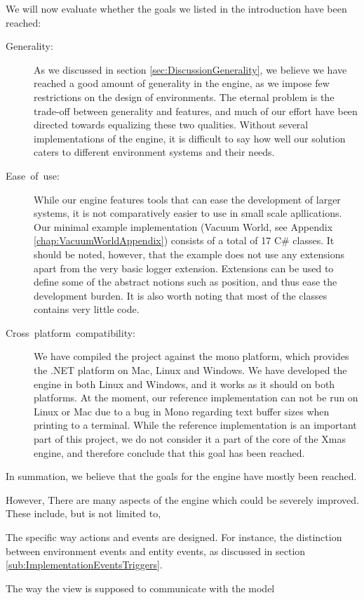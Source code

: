 We will now evaluate whether the goals we listed in the introduction
have been reached:
\begin{description}
\item [{Generality:}] As we discussed in section \ref{sec:DiscussionGenerality},
we believe we have reached a good amount of generality in the engine,
as we impose few restrictions on the design of environments. The eternal
problem is the trade-off between generality and features, and much
of our effort have been directed towards equalizing these two qualities.
Without several implementations of the engine, it is difficult to
say how well our solution caters to different environment systems
and their needs.
\item [{Ease~of~use:}] While our engine features tools that can ease
the development of larger systems, it is not comparatively easier
to use in small scale apllications. Our minimal example implementation
(Vacuum World, see Appendix \ref{chap:VacuumWorldAppendix}) consists
of a total of 17 C\# classes. It should be noted, however, that the
example does not use any extensions apart from the very basic logger
extension. Extensions can be used to define some of the abstract notions
such as position, and thus ease the development burden. It is also
worth noting that most of the classes contains very little code.
\item [{Cross~platform~compatibility:}] We have compiled the project
against the mono platform, which provides the .NET platform on Mac,
Linux and Windows. We have developed the engine in both Linux and
Windows, and it works as it should on both platforms. At the moment,
our reference implementation can not be run on Linux or Mac due to
a bug in Mono regarding text buffer sizes when printing to a terminal.
While the reference implementation is an important part of this project,
we do not consider it a part of the core of the Xmas engine, and therefore
conclude that this goal has been reached.
\end{description}
In summation, we believe that the goals for the engine have mostly
been reached.

However, There are many aspects of the engine which could be severely
improved. These include, but is not limited to, 

\textbullet{} The specific way actions and events are designed. For
instance, the distinction between environment events and entity events,
as discussed in section \ref{sub:ImplementationEventsTriggers}.

\textbullet{} The way the view is supposed to communicate with the
model

